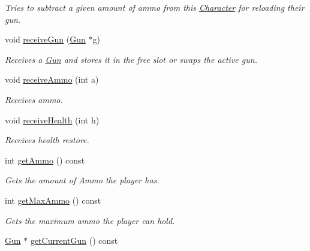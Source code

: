 \begin{DoxyCompactItemize}
\begin{DoxyCompactList}\small\item\em Tries to subtract a given amount of ammo from this \mbox{\hyperlink{class_character}{Character}} for reloading their gun. \end{DoxyCompactList}\item 
void \mbox{\hyperlink{class_player_adf6426172aadb1a138a84f1323ecdae6}{receive\+Gun}} (\mbox{\hyperlink{class_gun}{Gun}} $\ast$g)
\begin{DoxyCompactList}\small\item\em Receives a \mbox{\hyperlink{class_gun}{Gun}} and stores it in the free slot or swaps the active gun. \end{DoxyCompactList}\item 
void \mbox{\hyperlink{class_player_a1d6d1ea006e3d30cab6ccdf2392e5725}{receive\+Ammo}} (int a)
\begin{DoxyCompactList}\small\item\em Receives ammo. \end{DoxyCompactList}\item 
void \mbox{\hyperlink{class_player_aaa002a0d70ccd8bbd6286f7d95b223a6}{receive\+Health}} (int h)
\begin{DoxyCompactList}\small\item\em Receives health restore. \end{DoxyCompactList}\item 
\mbox{\label{class_player_ab46eec2d40fa4426b4585229c954c20a}} 
int \mbox{\hyperlink{class_player_ab46eec2d40fa4426b4585229c954c20a}{get\+Ammo}} () const
\begin{DoxyCompactList}\small\item\em Gets the amount of Ammo the player has. \end{DoxyCompactList}\item 
\mbox{\label{class_player_a91350174592289f8ec536bb543089564}} 
int \mbox{\hyperlink{class_player_a91350174592289f8ec536bb543089564}{get\+Max\+Ammo}} () const
\begin{DoxyCompactList}\small\item\em Gets the maximum ammo the player can hold. \end{DoxyCompactList}\item 
\mbox{\label{class_player_a677bf9fc80623c5ef83e448e09c44a6f}} 
\mbox{\hyperlink{class_gun}{Gun}} $\ast$ \mbox{\hyperlink{class_player_a677bf9fc80623c5ef83e448e09c44a6f}{get\+Current\+Gun}} () const

\end{DoxyCompactItemize}
